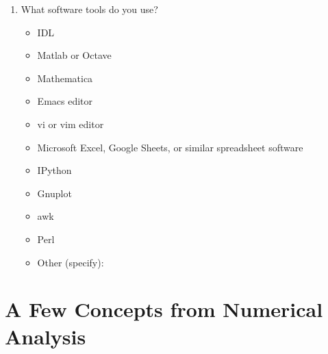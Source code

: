 \documentclass{article}
\begin{document}
\begin{enumerate}
\begin{enumerate}
\item
What software tools do you use?
\begin{itemize}
\renewcommand{\labelitemi}{$\square$} 
    \item IDL
    \item Matlab or Octave
    \item Mathematica
    \item Emacs editor
    \item vi or vim editor
    \item Microsoft Excel, Google Sheets, or similar spreadsheet software
    \item IPython
    \item Gnuplot
    \item awk
    \item Perl
    \item Other (specify):
\end{itemize}

\end{enumerate} 
\end{enumerate}




\clearpage
\section{A Few Concepts from Numerical Analysis}
\end{document}
